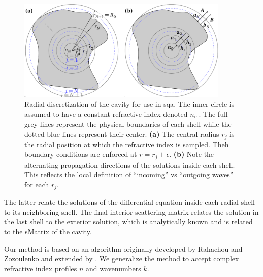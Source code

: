 \begin{figure}
 \centering
 \includegraphics[width=0.9\textwidth]{figs/passive/figDisScatCoeff.pdf}
 \caption[Radial discretization for use in SQA]
	 {Radial discretization of the cavity for use in \gls{sqa}. The inner circle is assumed to 
	 have a constant refractive index denoted $n_\text{in}$. The full grey lines represent
	 the physical boundaries of each shell while the dotted blue lines represent their
	 center. \textbf{(a)} The central radius $r_j$ is the radial position at which the 
	 refractive index is sampled. Theh boundary conditions are enforced at $r=r_j\pm\epsilon$.
	 \textbf{(b)} Note the alternating propagation directions of the solutions inside each shell.
	 This reflects the local definition of ``incoming'' vs ``outgoing waves'' for each $r_j$.}
  \label{fig:passive.numerical.radialDiscretization}
\end{figure}

The latter relate the solutions of the differential equation 
inside each radial shell to its neighboring shell. The final
interior scattering matrix relates the solution in the last shell
to the exterior solution, which is analytically known and is 
related to the \gls{sMatrix} of the cavity.

Our method is based on an algorithm originally developed by 
Rahachou and Zozoulenko \cite{RAH2004} and extended by \cite{GAP2013a}. 
We generalize the method to accept complex refractive index
profiles $n$ and wavenumbers $k$. 

